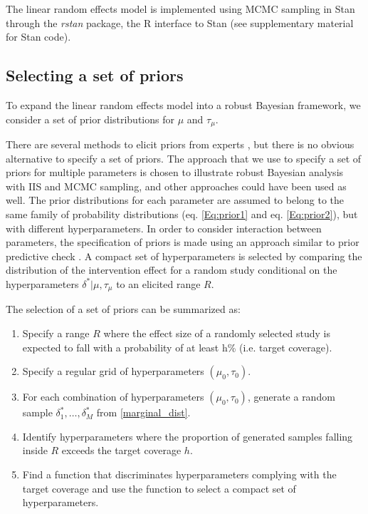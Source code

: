 \documentclass{amsart}
\theoremstyle{plain}%
\begin{document}
The linear random effects model is implemented using MCMC sampling in Stan through 
the \emph {rstan} package, the R interface to Stan \citep{RStan} 
(see supplementary material for Stan code).

\subsection{Selecting a set of priors}

To expand the linear random effects model into a robust Bayesian framework, we consider a set of prior distributions
for $\mu$ and $\tau_\mu$. 

There are several methods to elicit priors from experts \citep{OHagan_2006, Hanea_2021, Hartmann_2020, SHELF_2018}, but there is no obvious alternative to specify a set of priors. The approach that we use to specify a set of priors for multiple parameters is chosen to illustrate robust Bayesian analysis with IIS and MCMC sampling, and other approaches could have been used as well. 
The prior distributions for each parameter are assumed to belong to the same family of probability
distributions (eq. \ref{Eq:prior1} and eq. \ref{Eq:prior2}), but with different hyperparameters. 
In order to consider interaction between parameters, the specification of priors is made using an approach similar to prior predictive check \citep{Daimon_2008, Schad_2019}.  
A compact set of hyperparameters is selected by comparing the distribution of the intervention effect for a random study conditional on the hyperparameters $\delta^*|\mu,\tau_{\mu}$ to an elicited range $R$. 

The selection of a set of priors can be summarized as:  
\begin{enumerate}
\item Specify a range $R$ where the effect size of a randomly selected study is expected to fall with a probability of at least h\% (i.e. target coverage).
\item Specify a regular grid of hyperparameters $(\mu_0, \tau_0)$. 
\item For each combination of hyperparameters $(\mu_0, \tau_0)$, generate a random sample $\delta^*_1, \dots, \delta^*_M$ from \cref{marginal_dist}.
\item Identify hyperparameters where the proportion of generated samples falling inside $R$ 
exceeds the target coverage $h$.
\item Find a function that discriminates hyperparameters complying with the target coverage and use the function to select a compact set of hyperparameters.
\end{enumerate}
\end{document}
